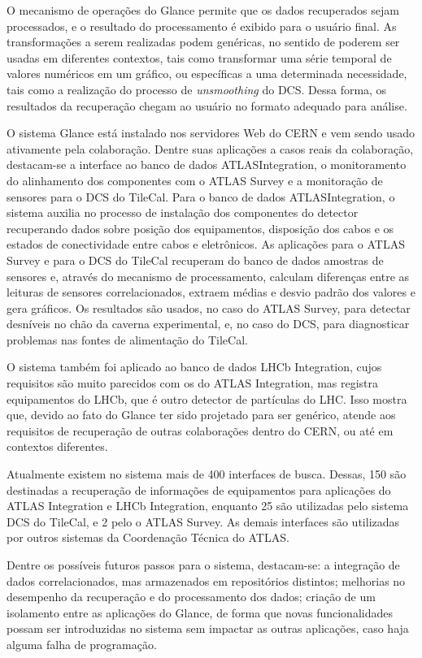 O mecanismo de operações do Glance permite que os dados recuperados sejam
processados, e o resultado do processamento é exibido para o usuário final.
As transformações a serem realizadas podem genéricas, no sentido de poderem ser
usadas em diferentes contextos, tais como transformar uma série temporal de
valores numéricos em um gráfico, ou específicas a uma determinada necessidade,
tais como a realização do processo de \textit{unsmoothing} do DCS.
Dessa forma, os resultados da recuperação chegam ao usuário no formato adequado
para análise.

O sistema Glance está instalado nos servidores Web do CERN e vem sendo usado
ativamente pela colaboração.
%
Dentre suas aplicações a casos reais da colaboração, destacam-se a interface ao
banco de dados ATLASIntegration, o monitoramento do alinhamento dos componentes
com o ATLAS Survey e a monitoração de sensores para o DCS do TileCal.
%
Para o banco de dados ATLASIntegration, o sistema auxilia no processo de
instalação dos componentes do detector recuperando dados sobre posição dos
equipamentos, disposição dos cabos e os estados de conectividade entre cabos e
eletrônicos.
%
As aplicações para o ATLAS Survey e para o DCS do TileCal recuperam do banco de
dados amostras de sensores e, através do mecanismo de processamento, calculam
diferenças entre as leituras de sensores correlacionados, extraem médias e desvio
padrão dos valores e gera gráficos.
%
Os resultados são usados, no caso do ATLAS Survey, para detectar desníveis no
chão da caverna experimental, e, no caso do DCS, para diagnosticar problemas nas
fontes de alimentação do TileCal.

O sistema também foi aplicado ao banco de dados LHCb Integration, cujos
requisitos são muito parecidos com os do ATLAS Integration, mas registra
equipamentos do LHCb, que é outro detector de partículas do LHC.
%
Isso mostra que, devido ao fato do Glance ter sido projetado para ser genérico,
atende aos requisitos de recuperação de outras colaborações dentro do CERN, ou
até em contextos diferentes.

Atualmente existem no sistema mais de 400 interfaces de busca. Dessas, 150 são
destinadas a recuperação de informações de equipamentos para aplicações do
ATLAS Integration e LHCb Integration, enquanto 25 são utilizadas pelo sistema
DCS do TileCal, e 2 pelo o ATLAS Survey. As demais interfaces são utilizadas
por outros sistemas da Coordenação Técnica do ATLAS.

Dentre os possíveis futuros passos para o sistema, destacam-se: a integração
de dados correlacionados, mas armazenados em repositórios distintos; melhorias
no desempenho da recuperação e do processamento dos dados; criação de um
isolamento entre as aplicações do Glance, de forma que novas funcionalidades
possam ser introduzidas no sistema sem impactar as outras aplicações, caso haja
alguma falha de programação.


